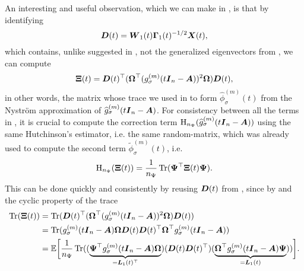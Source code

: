 An interesting and useful observation, which we can make in ,
is that by identifying
\begin{equation}
    \boldsymbol{D}(t) = \boldsymbol{W}_1(t) \boldsymbol{\Gamma}_1(t)^{-1/2} \boldsymbol{X}(t),
    \label{equ:4-nystromchebyshev-generalized-eigenvector}
\end{equation}
which contains, unlike suggested in \cite[algorithm~4]{lin2017randomized},
not the generalized eigenvectors from ,
we can compute
\begin{equation}
    \boldsymbol{\Xi}(t) = \boldsymbol{D}(t)^{\top} (\boldsymbol{\Omega}^{\top} (g_{\sigma}^{(m)}(t\boldsymbol{I}_n - \boldsymbol{A}))^2 \boldsymbol{\Omega}) \boldsymbol{D}(t),
    \label{equ:4-nystromchebyshev-generalized-eigenvector-xi}
\end{equation}
in other words, the matrix whose trace we used in 
to form $\widehat{\phi}_{\sigma}^{(m)}(t)$ from the Nystr\"om approximation of
$\widehat{g}_{\sigma}^{(m)}(t\boldsymbol{I}_n - \boldsymbol{A})$.
For consistency between all the terms in ,
it is crucial to compute the correction term $\operatorname{H}_{n_{\Psi}}(\widehat{g}_{\sigma}^{(m)}(t\boldsymbol{I}_n - \boldsymbol{A}))$
using the same Hutchinson's estimator, i.e. the same \gls{random-matrix}, which was already used to compute the
second term $\widetilde{\phi}_{\sigma}^{(m)}(t)$, i.e.
\begin{equation}
    \operatorname{H}_{n_{\Psi}}(\boldsymbol{\Xi}(t)) = \frac{1}{n_{\Psi}} \operatorname{Tr}(\boldsymbol{\Psi}^{\top} \boldsymbol{\Xi}(t) \boldsymbol{\Psi}).
\end{equation}
This can be done quickly and consistently by reusing $\boldsymbol{D}(t)$ from ,
since by  and the cyclic property of the trace
\begin{align*}
    \operatorname{Tr}(\boldsymbol{\Xi}(t))
    &= \operatorname{Tr}(\boldsymbol{D}(t)^{\top} (\boldsymbol{\Omega}^{\top} (g_{\sigma}^{(m)}(t\boldsymbol{I}_n - \boldsymbol{A}))^2 \boldsymbol{\Omega}) \boldsymbol{D}(t)) \notag \\
    &= \operatorname{Tr}( g_{\sigma}^{(m)}(t\boldsymbol{I}_n - \boldsymbol{A}) \boldsymbol{\Omega} \boldsymbol{D}(t) \boldsymbol{D}(t)^{\top} \boldsymbol{\Omega}^{\top} g_{\sigma}^{(m)}(t\boldsymbol{I}_n - \boldsymbol{A})) \notag \\
    &= \mathbb{E}\bigg[\frac{1}{n_{\Psi}} \operatorname{Tr}( (\underbrace{\boldsymbol{\Psi}^{\top} g_{\sigma}^{(m)}(t\boldsymbol{I}_n - \boldsymbol{A}) \boldsymbol{\Omega}}_{=\boldsymbol{L}_1(t)^{\top}})
                                               (\boldsymbol{D}(t) \boldsymbol{D}(t)^{\top})
                                               (\underbrace{\boldsymbol{\Omega}^{\top} g_{\sigma}^{(m)}(t\boldsymbol{I}_n - \boldsymbol{A}) \boldsymbol{\Psi}}_{=\boldsymbol{L}_1(t)})) \bigg].
    \label{equ:4-nystromchebyshev-generalized-eigenvector-trace}
\end{align*}

